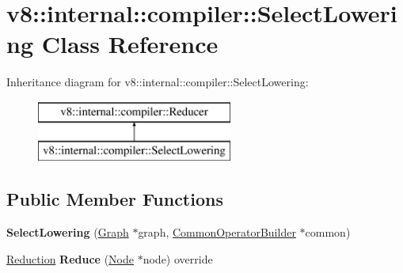 \hypertarget{classv8_1_1internal_1_1compiler_1_1_select_lowering}{}\section{v8\+:\+:internal\+:\+:compiler\+:\+:Select\+Lowering Class Reference}
\label{classv8_1_1internal_1_1compiler_1_1_select_lowering}
Inheritance diagram for v8\+:\+:internal\+:\+:compiler\+:\+:Select\+Lowering\+:\begin{figure}[H]
\begin{center}
\leavevmode
\includegraphics[height=2.000000cm]{classv8_1_1internal_1_1compiler_1_1_select_lowering}
\end{center}
\end{figure}
\subsection*{Public Member Functions}
\begin{DoxyCompactItemize}
\item 
{\bfseries Select\+Lowering} (\hyperlink{classv8_1_1internal_1_1compiler_1_1_graph}{Graph} $\ast$graph, \hyperlink{classv8_1_1internal_1_1compiler_1_1_common_operator_builder}{Common\+Operator\+Builder} $\ast$common)\hypertarget{classv8_1_1internal_1_1compiler_1_1_select_lowering_af6aa3aede7f98ac8af20fc9a916c3ec4}{}\label{classv8_1_1internal_1_1compiler_1_1_select_lowering_af6aa3aede7f98ac8af20fc9a916c3ec4}

\item 
\hyperlink{classv8_1_1internal_1_1compiler_1_1_reduction}{Reduction} {\bfseries Reduce} (\hyperlink{classv8_1_1internal_1_1compiler_1_1_node}{Node} $\ast$node) override\hypertarget{classv8_1_1internal_1_1compiler_1_1_select_lowering_a7b7eeb6a4c9766b05a1c13d3cc2ec9d4}{}\label{classv8_1_1internal_1_1compiler_1_1_select_lowering_a7b7eeb6a4c9766b05a1c13d3cc2ec9d4}

\end{DoxyCompactItemize}

